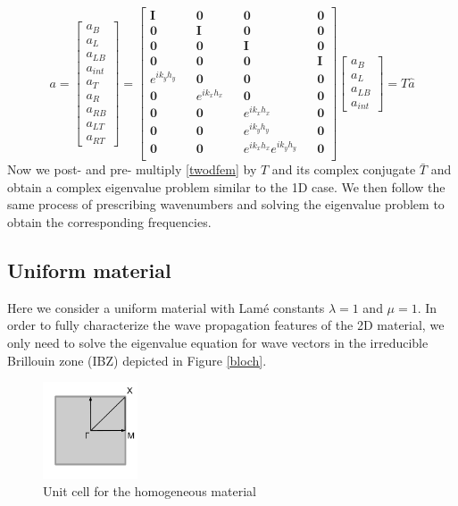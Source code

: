 \documentclass{article}
\begin{document}
\begin{equation}
a =
\begin{bmatrix}
a_{B} \\
a_{L} \\
a_{LB} \\
a_{int} \\
a_{T} \\
a_{R} \\
a_{RB} \\
a_{LT} \\
a_{RT} 
\end{bmatrix}
= 
\begin{bmatrix}
\mathbf{I} && \mathbf{0} && \mathbf{0} && \mathbf{0}\\
\mathbf{0} && \mathbf{I} && \mathbf{0} && \mathbf{0}\\
\mathbf{0} && \mathbf{0} && \mathbf{I} && \mathbf{0}\\ 
\mathbf{0} && \mathbf{0} && \mathbf{0} && \mathbf{I}\\
e^{ik_yh_y} && \mathbf{0} && \mathbf{0} && \mathbf{0} \\
\mathbf{0} && e^{ik_xh_x} && \mathbf{0} && \mathbf{0}\\
\mathbf{0} && \mathbf{0} && e^{ik_xh_x} && \mathbf{0}\\
\mathbf{0} && \mathbf{0} && e^{ik_yh_y} && \mathbf{0}\\
\mathbf{0} && \mathbf{0} && e^{ik_xh_x}e^{ik_yh_y} && \mathbf{0}\\
\end{bmatrix}
\begin{bmatrix}
a_{B} \\
a_{L} \\
a_{LB} \\
a_{int} 
\end{bmatrix}
= T \hat{a}
\end{equation}
Now we post- and pre- multiply \ref{twodfem} by $T$ and its complex conjugate 
$\bar{T}$ and obtain a complex eigenvalue problem similar to the 1D case. We 
then follow the same process of prescribing wavenumbers and solving the 
eigenvalue problem to obtain the corresponding frequencies.

\subsection{Uniform material}
Here we consider a uniform material with Lam\'e constants $\lambda=1$ and 
$\mu=1$. In order to fully characterize the wave propagation features of the 2D 
material, we only need to solve the eigenvalue equation for wave vectors in the 
irreducible Brillouin zone (IBZ) depicted in Figure \ref{bloch}.
\begin{figure}[!htbp]
	\centering
	\includegraphics[width=0.25\textwidth]{twodunifcell.pdf}
	\caption{Unit cell for the homogeneous material}
	\label{fig:twodunifcell}
\end{figure}
\end{document}
